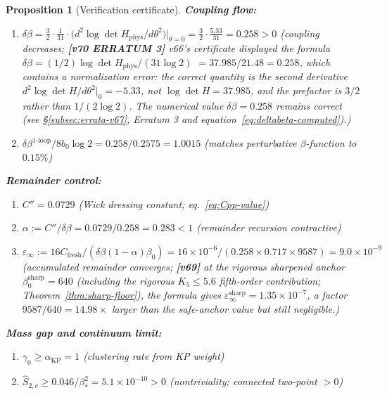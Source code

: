 \documentclass[11pt]{article}
\newtheorem{proposition}[theorem]{Proposition}
\theoremstyle{definition}
\begin{document}
\begin{proposition}[Verification certificate]
\noindent\textbf{Coupling flow:}
\begin{enumerate}[nosep,label=(V\arabic*),resume]
\item $\delta\beta=\tfrac{3}{2}\cdot\tfrac{1}{31}\cdot
\bigl(d^2 \log\det H_{\mathrm{phys}}/d\theta^2\bigr)\big|_{\theta=0}
=\tfrac{3}{2}\cdot\tfrac{5.33}{31}=0.258>0$
\quad\emph{(coupling decreases; \textbf{[v70 ERRATUM 3]}
v66's certificate displayed the formula
$\delta\beta=(1/2)\log\det H_{\mathrm{phys}}/(31\log 2)$
$=37.985/21.48=0.258$, which contains a normalization error:
the correct quantity is the second derivative
$d^2\log\det H/d\theta^2|_0=-5.33$, not $\log\det H=37.985$, and
the prefactor is $3/2$ rather than $1/(2\log 2)$.  The numerical
value $\delta\beta=0.258$ remains correct \textup{(}see
\S\ref{subsec:errata-v67}, Erratum 3 and
equation~\eqref{eq:deltabeta-computed}\textup{)}.)}
\item $\delta\beta^{1\text{-loop}}/8b_0\log 2
=0.258/0.2575=1.0015$
\quad\emph{(matches perturbative $\beta$-function to $0.15\%$)}
\end{enumerate}

\noindent\textbf{Remainder control:}
\begin{enumerate}[nosep,label=(V\arabic*),resume]
\item $C''=0.0729$
\quad\emph{(Wick dressing constant; eq.~\eqref{eq:Cpp-value})}
\item $\alpha:=C''/\delta\beta=0.0729/0.258=0.283<1$
\quad\emph{(remainder recursion contractive)}
\item $\varepsilon_\infty:=
16C_{\mathrm{fresh}}/(\delta\beta(1-\alpha)\beta_0)
=16\times 10^{-6}/(0.258\times 0.717\times 9587)
=9.0\times 10^{-9}$
\quad\emph{(accumulated remainder converges; \textbf{[v69]} at the
rigorous sharpened anchor $\beta_0^{\mathrm{sharp}}=640$
\textup{(}including the rigorous $K_5\le 5.6$ fifth-order
contribution; Theorem~\ref{thm:sharp-floor}\textup{)}, the formula
gives $\varepsilon_\infty^{\mathrm{sharp}} = 1.35\times 10^{-7}$, a
factor $9587/640 = 14.98\times$ larger than the safe-anchor value
but still negligible.)}
\end{enumerate}

\noindent\textbf{Mass gap and continuum limit:}
\begin{enumerate}[nosep,label=(V\arabic*),resume]
\item $\gamma_0\ge\alpha_{\mathrm{KP}}=1$
\quad\emph{(clustering rate from KP weight)}
\item $\hat S_{2,c}\ge 0.046/\beta_*^2
=5.1\times 10^{-10}>0$
\quad\emph{(nontriviality; connected two-point $>0$)}
\end{enumerate}


\end{proposition}
\end{document}
